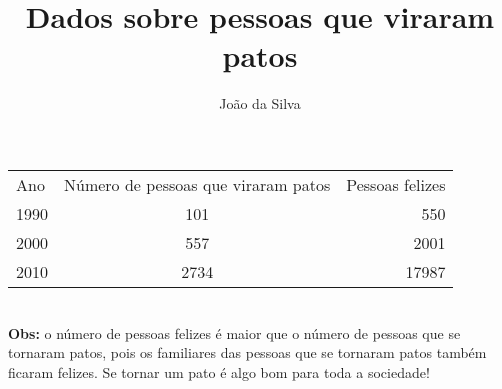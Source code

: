 \documentclass[12pt, a4paper]{article}
\title{Dados sobre pessoas que viraram patos}
\author{João da Silva}
\begin{document}
  \maketitle

  \begin{tabular}{l c r}
    Ano & Número de pessoas que viraram patos & Pessoas felizes\\
    1990 & 101 & 550\\
    2000 & 557 & 2001\\
    2010 & 2734 & 17987\\
  \end{tabular}
  \\[2cm]
  \textbf{Obs:} o número de pessoas felizes é maior que o número de pessoas que se tornaram patos, pois os familiares das pessoas que se tornaram patos também ficaram felizes. Se tornar um pato é algo bom para toda a sociedade!
\end{document}
